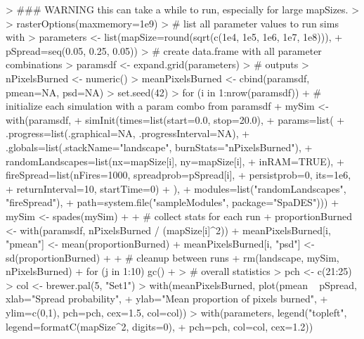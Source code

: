 \documentclass{article}
\begin{document}
\begin{Schunk}
\begin{Sinput}
> ### WARNING this can take a while to run, especially for large mapSizes.
>
> rasterOptions(maxmemory=1e9)
> # list all parameter values to run sims with
> parameters <- list(mapSize=round(sqrt(c(1e4, 1e5, 1e6, 1e7, 1e8))),
+                    pSpread=seq(0.05, 0.25, 0.05))
> # create data.frame with all parameter combinations
> paramsdf <- expand.grid(parameters)
> # outputs
> nPixelsBurned <- numeric()
> meanPixelsBurned <- cbind(paramsdf, pmean=NA, psd=NA)
> set.seed(42)
> for (i in 1:nrow(paramsdf)) {
+   # initialize each simulation with a param combo from paramsdf
+   mySim <- with(paramsdf,
+                 simInit(times=list(start=0.0, stop=20.0),
+                         params=list(
+                           .progress=list(.graphical=NA, .progressInterval=NA),
+                           .globals=list(.stackName="landscape", burnStats="nPixelsBurned"),
+                           randomLandscapes=list(nx=mapSize[i], ny=mapSize[i],
+                                                 inRAM=TRUE),
+                           fireSpread=list(nFires=1000, spreadprob=pSpread[i],
+                                           persistprob=0, its=1e6,
+                                           returnInterval=10, startTime=0)
+                           ),
+                         modules=list("randomLandscapes", "fireSpread"),
+                         path=system.file("sampleModules", package="SpaDES")))
+   mySim <- spades(mySim)
+
+   # collect stats for each run
+   proportionBurned <- with(paramsdf, nPixelsBurned / (mapSize[i]^2))
+   meanPixelsBurned[i, "pmean"] <- mean(proportionBurned)
+   meanPixelsBurned[i, "psd"] <- sd(proportionBurned)
+
+   # cleanup between runs
+   rm(landscape, mySim, nPixelsBurned)
+   for (j in 1:10) gc()
+ }
> # overall statistics
> pch <- c(21:25)
> col <- brewer.pal(5, "Set1")
> with(meanPixelsBurned, plot(pmean ~ pSpread, xlab="Spread probability",
+                             ylab="Mean proportion of pixels burned",
+                             ylim=c(0,1), pch=pch, cex=1.5, col=col))
> with(parameters, legend("topleft", legend=formatC(mapSize^2, digits=0),
+                               pch=pch, col=col, cex=1.2))
\end{Sinput}
\end{Schunk}
\end{document}
